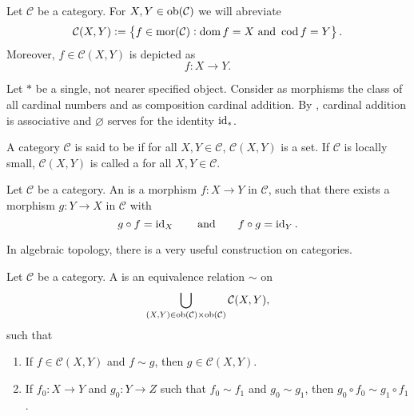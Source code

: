\begin{remark}
	Let $\mathcal{C}$ be a category. For $X,Y \in \operatorname{ob}(\mathcal{C})$ we will abreviate
	\begin{equation*}
		\mathcal{C}(X,Y) := \cbr{f \in \mor(\mathcal{C}) : \dom f = X \text{ and } \cod f = Y}.
	\end{equation*}
	Moreover, $f \in \mathcal{C}(X,Y)$ is depicted as
	\begin{equation}
		f : X \to Y.
	\end{equation}
\end{remark}

\begin{example}
	Let $\ast$ be a single, not nearer specified object. Consider as morphisms the class of all cardinal numbers and as composition cardinal addition. By \cite[112--113]{halbeisen:set_theory:2012}, cardinal addition is associative and $\varnothing$ serves for the identity $\operatorname{id}_\ast$.  
\end{example}

\begin{definition}
	A category $\mathcal{C}$ is said to be  if for all $X,Y \in \mathcal{C}$, $\mathcal{C}(X,Y)$ is a set. If $\mathcal{C}$ is locally small, $\mathcal{C}(X,Y)$ is called a  for all $X,Y \in \mathcal{C}$. 
\end{definition}

\begin{definition}[Isomorphism]
	Let $\mathcal{C}$ be a category. An  is a morphism $f : X \to Y$ in $\mathcal{C}$, such that there exists a morphism $g : Y \to X$ in $\mathcal{C}$ with 
	\begin{equation*}
		g \circ f = \operatorname{id}_X \qquad \text{and} \qquad f \circ g = \operatorname{id}_Y.
	\end{equation*}
\end{definition}

In algebraic topology, there is a very useful construction on categories.

\begin{definition}[Congruence]
	Let $\mathcal{C}$ be a category. A  is an equivalence relation $\sim$ on 
	\begin{equation*}
		\bigcup_{(X,Y) \in \operatorname{ob}(\mathcal{C}) \times \operatorname{ob}(\mathcal{C})}\mathcal{C}(X,Y),
	\end{equation*}
	\noindent such that 
	\begin{enumerate}[label = \textup{(}\alph*\textup{)},wide = 0pt]
		\item If $f \in \mathcal{C}(X,Y)$ and $f {\sim} g$, then $g \in \mathcal{C}(X,Y)$.
		\item If $f_0 : X \to Y$ and $g_0 : Y \to Z$ such that $f_0 {\sim} f_1$ and $g_0 {\sim} g_1$, then $g_0 \circ f_0 {\sim} g_1 \circ f_1$.
	\end{enumerate}
\end{definition}

